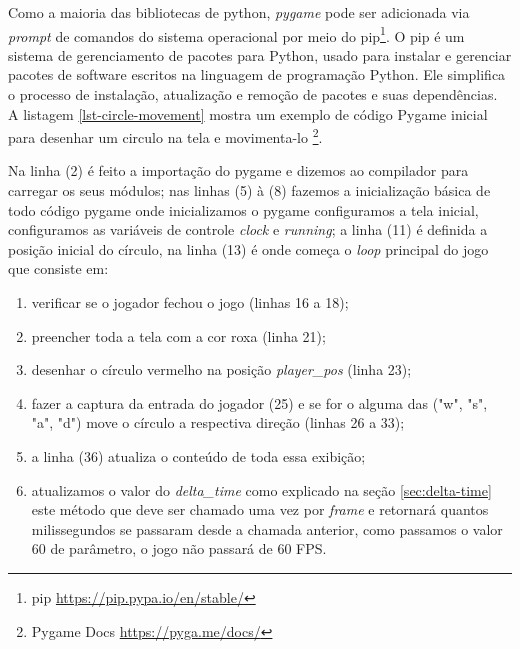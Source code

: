 Como a maioria das bibliotecas de python, \textit{pygame} pode ser adicionada via \textit{prompt} de comandos do sistema operacional  por meio do pip\footnote{pip \url{https://pip.pypa.io/en/stable/}}. O pip é um sistema de gerenciamento de pacotes para Python, usado para instalar e gerenciar pacotes de software escritos na linguagem de programação Python. Ele simplifica o processo de instalação, atualização e remoção de pacotes e suas dependências. A listagem \ref{lst-circle-movement} mostra um exemplo de código Pygame inicial para desenhar um circulo na tela e movimenta-lo \footnote{Pygame Docs \url{https://pyga.me/docs/}}. 

\newpage

Na linha (2) é feito a importação do pygame e dizemos ao compilador para carregar os seus módulos; nas linhas (5) à (8) fazemos a inicialização básica de todo código pygame onde inicializamos o pygame configuramos a tela inicial, configuramos as variáveis de controle \textit{clock} e \textit{running}; a linha (11) é definida a posição inicial do círculo, na linha (13) é onde começa o \textit{loop} principal do jogo que consiste em:
\begin{enumerate}
    \item verificar se o jogador fechou o jogo (linhas 16 a 18);
    \item preencher toda a tela com a cor roxa (linha 21);
    \item desenhar o círculo vermelho na posição \textit{player\_pos} (linha 23);
    \item fazer a captura da entrada do jogador (25) e se for o alguma das ("w", "s", "a", "d") move o círculo a respectiva direção (linhas 26 a 33);
    \item a linha (36) atualiza o conteúdo de toda essa exibição;
    \item atualizamos o valor do \textit{delta\_time} como explicado na seção \ref{sec:delta-time} este método que deve ser chamado uma vez por \textit{frame} e retornará quantos milissegundos se passaram desde a chamada anterior, como passamos o valor 60 de parâmetro, o jogo não passará de 60 FPS.
\end{enumerate}

